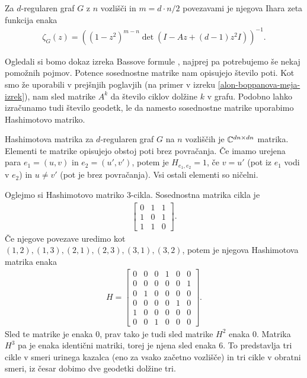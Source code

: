 \begin{izrek}\label{zeta-je-racionalna-bass}
    Za \(d\)-regularen graf \(G\) z \(n\) vozlišči in \(m=d\cdot n / 2\) povezavami je njegova Ihara zeta funkcija enaka
    \begin{align*}
        \zeta_G(z) = \left((1-z^2)^{m-n}\det(I-Az+(d-1)z^2I)\right)^{-1}.
    \end{align*}
\end{izrek}
Ogledali si bomo dokaz izreka Bassove formule \cite{rangarajan:LIPIcs.FSTTCS.2017.46}, najprej pa potrebujemo še nekaj pomožnih pojmov. Potence sosednostne matrike nam opisujejo število poti. Kot smo že uporabili v prejšnjih poglavjih (na primer v izreku \ref{alon-boppanova-meja-izrek}), nam sled matrike \(A^k\) da število ciklov dolžine \(k\) v grafu. Podobno lahko izračunamo tudi število geodetk, le da namesto sosednostne matrike uporabimo Hashimotovo matriko.
\begin{definicija}
    Hashimotova matrika za \(d\)-regularen graf \(G\) na \(n\) vozliščih je \(\mathbb C^{dn\times dn}\) matrika. Elementi te matrike opisujejo obstoj poti brez povračanja. Če imamo urejena para \(e_1 = (u, v)\) in \(e_2= (u', v')\), potem je \(H_{e_1, e_2}=1\), če \(v = u'\) (pot iz \(e_1\) vodi v \(e_2\)) in \(u\neq v'\) (pot je brez povračanja). Vsi ostali elementi so ničelni.
\end{definicija}
\begin{primer}
    Oglejmo si Hashimotovo matriko \(3\)-cikla. Sosednostna matrika cikla je
    \begin{align*}
        \begin{bmatrix}
            0&1&1\\
            1&0&1\\
            1&1&0
        \end{bmatrix}.
    \end{align*}
    Če njegove povezave uredimo kot \((1,2), (1,3), (2,1), (2,3), (3,1), (3,2)\), potem je njegova Hashimotova matrika enaka
    \begin{align*}
        H = \begin{bmatrix}
            0&0&0&1&0&0\\
            0&0&0&0&0&1\\
            0&1&0&0&0&0\\
            0&0&0&0&1&0\\
            1&0&0&0&0&0\\
            0&0&1&0&0&0
        \end{bmatrix}.
    \end{align*}
    Sled te matrike je enaka \(0\), prav tako je tudi sled matrike \(H^2\) enaka 0. Matrika \(H^3\) pa je enaka identični matriki, torej je njena sled enaka \(6\). To predstavlja tri cikle v smeri urinega kazalca (eno za vsako začetno vozlišče) in tri cikle v obratni smeri, iz česar dobimo dve geodetki dolžine tri. 
\end{primer}
